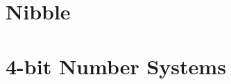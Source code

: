\documentclass[11pt]{article}
\begin{document}
\vfill

\clearpage

\begin{minipage}[t]{0.62\linewidth}
    \begin{minipage}[t]{0.48\linewidth}
        \section*{Nibble}
        
    \end{minipage}
    \hfill
    \begin{minipage}[t]{0.48\linewidth}
        \section*{4-bit Number Systems}
        
    \end{minipage}

    \vspace{1em}

    \begin{minipage}[t]{0.48\linewidth}
        
    \end{minipage}
    \hfill
    \begin{minipage}[t]{0.48\linewidth}
        
    \end{minipage}

    \begin{minipage}[t]{\linewidth}
        
    \end{minipage}

    \vspace{1em}

    \begin{minipage}[t]{\linewidth}
        
    \end{minipage}
\end{minipage}
\hfill
\begin{minipage}[t]{0.35\linewidth}
    
\end{minipage}
\end{document}

